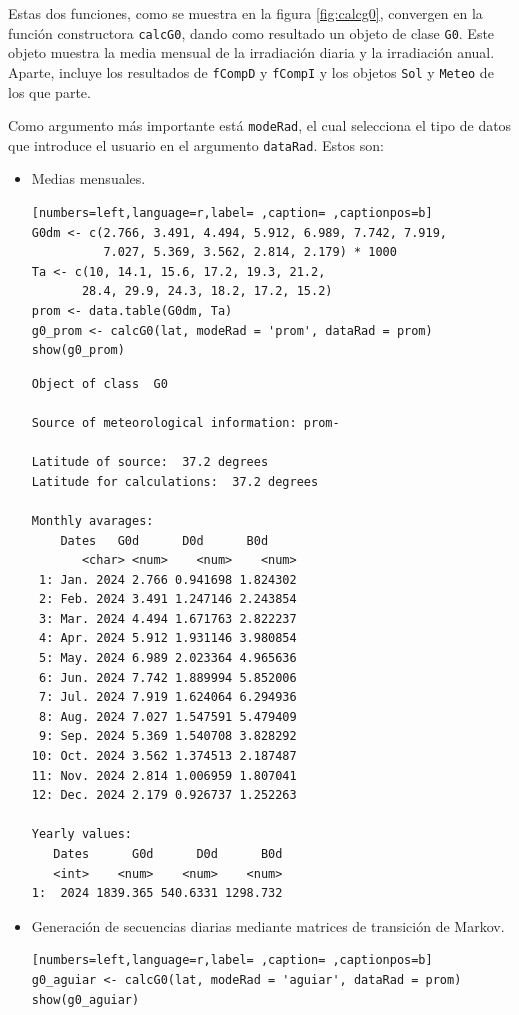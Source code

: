 Estas dos funciones, como se muestra en la figura \ref{fig:calcg0}, convergen en la función constructora \texttt{calcG0}, dando como resultado un objeto de clase \texttt{G0}. Este objeto muestra la media mensual de la irradiación diaria y la irradiación anual. Aparte, incluye los resultados de \texttt{fCompD} y \texttt{fCompI} y los objetos \texttt{Sol} y \texttt{Meteo} de los que parte.

Como argumento más importante está \texttt{modeRad}, el cual selecciona el tipo de datos que introduce el usuario en el argumento \texttt{dataRad}. Estos son:
\begin{itemize}
\item Medias mensuales.
\begin{lstlisting}[numbers=left,language=r,label= ,caption= ,captionpos=b]
G0dm <- c(2.766, 3.491, 4.494, 5.912, 6.989, 7.742, 7.919,
          7.027, 5.369, 3.562, 2.814, 2.179) * 1000
Ta <- c(10, 14.1, 15.6, 17.2, 19.3, 21.2,
       28.4, 29.9, 24.3, 18.2, 17.2, 15.2)
prom <- data.table(G0dm, Ta) 
g0_prom <- calcG0(lat, modeRad = 'prom', dataRad = prom)
show(g0_prom)
\end{lstlisting}

\begin{verbatim}
Object of class  G0 

Source of meteorological information: prom- 

Latitude of source:  37.2 degrees
Latitude for calculations:  37.2 degrees

Monthly avarages:
	Dates   G0d      D0d      B0d
       <char> <num>    <num>    <num>
 1: Jan. 2024 2.766 0.941698 1.824302
 2: Feb. 2024 3.491 1.247146 2.243854
 3: Mar. 2024 4.494 1.671763 2.822237
 4: Apr. 2024 5.912 1.931146 3.980854
 5: May. 2024 6.989 2.023364 4.965636
 6: Jun. 2024 7.742 1.889994 5.852006
 7: Jul. 2024 7.919 1.624064 6.294936
 8: Aug. 2024 7.027 1.547591 5.479409
 9: Sep. 2024 5.369 1.540708 3.828292
10: Oct. 2024 3.562 1.374513 2.187487
11: Nov. 2024 2.814 1.006959 1.807041
12: Dec. 2024 2.179 0.926737 1.252263

Yearly values:
   Dates      G0d      D0d      B0d
   <int>    <num>    <num>    <num>
1:  2024 1839.365 540.6331 1298.732
\end{verbatim}

\item Generación de secuencias diarias mediante matrices de transición de Markov.
\begin{lstlisting}[numbers=left,language=r,label= ,caption= ,captionpos=b]
g0_aguiar <- calcG0(lat, modeRad = 'aguiar', dataRad = prom)
show(g0_aguiar)
\end{lstlisting}


\end{itemize}
